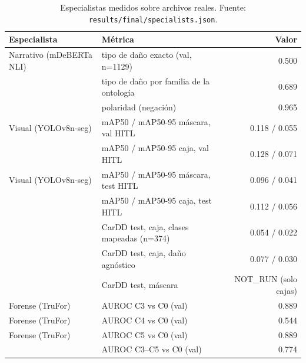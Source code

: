 \begin{table}[H]\centering\footnotesize
\begin{tabular}{llr}
\toprule
\textbf{Especialista} & \textbf{Métrica} & \textbf{Valor} \\ \midrule
Narrativo (mDeBERTa NLI) & tipo de daño exacto (val, n=1129) & 0.500 \\
 & tipo de daño por familia de la ontología & 0.689 \\
 & polaridad (negación) & 0.965 \\
Visual (YOLOv8n-seg) & mAP50 / mAP50-95 máscara, val HITL & 0.118 / 0.055 \\
 & mAP50 / mAP50-95 caja, val HITL & 0.128 / 0.071 \\
Visual (YOLOv8n-seg) & mAP50 / mAP50-95 máscara, test HITL & 0.096 / 0.041 \\
 & mAP50 / mAP50-95 caja, test HITL & 0.112 / 0.056 \\
 & CarDD test, caja, clases mapeadas (n=374) & 0.054 / 0.022 \\
 & CarDD test, caja, daño agnóstico & 0.077 / 0.030 \\
 & CarDD test, máscara & NOT\_RUN (solo cajas) \\
Forense (TruFor) & AUROC C3 vs C0 (val) & 0.889 \\
Forense (TruFor) & AUROC C4 vs C0 (val) & 0.544 \\
Forense (TruFor) & AUROC C5 vs C0 (val) & 0.889 \\
 & AUROC C3--C5 vs C0 (val) & 0.774 \\
\bottomrule
\end{tabular}
\caption{Especialistas medidos sobre archivos reales. Fuente: \texttt{results/final/specialists.json}.}
\label{tab:especialistas}
\end{table}
